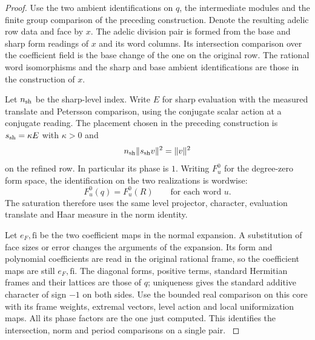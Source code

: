 \begin{proof}
Use the two ambient identifications on \(q\), the intermediate
modules and the finite group comparison of the preceding
construction. Denote the resulting adelic row data and face by
\(x\). The adelic division pair is formed from the base and
sharp form readings of \(x\) and its word columns. Its
intersection comparison over the coefficient field is the
base change of the one on the original row. The rational word
isomorphisms and the sharp and base ambient identifications
are those in the construction of \(x\).

Let \(n_{\rm sh}\) be the sharp-level index. Write \(E\) for
sharp evaluation with the measured translate and Petersson
comparison, using the conjugate scalar action at a conjugate
reading. The placement chosen in the preceding construction
is \(s_{\rm sh}=\kappa E\) with \(\kappa>0\) and
\[
                 n_{\rm sh}\|s_{\rm sh}v\|^2=\|v\|^2
\]
on the refined row. In particular its phase is \(1\). Writing \(F_u^0\) for the degree-zero form space, the identification on the two realizations is wordwise:
\[
 F_u^0(q)=F_u^0(R)\qquad\text{for each word }u .
\]
The saturation therefore uses the same level projector, character,
evaluation translate and Haar measure in the norm identity.

Let \(e_F,\mathrm{fi}\) be the two coefficient maps in the normal
expansion. A substitution of face sizes or error changes the
arguments of the expansion. Its form and polynomial coefficients
are read in the original rational frame, so the coefficient maps
are still \(e_F,\mathrm{fi}\). The diagonal forms, positive
terms, standard Hermitian frames and their lattices are those
of \(q\); uniqueness gives the standard additive character of
sign \(-1\) on both sides. Use the bounded real comparison on
this core with its frame weights, extremal vectors, level action
and local uniformization maps. All its phase factors are the
one just computed. This identifies the intersection, norm and
period comparisons on a single pair. \label{cor:completed-division-1}



\end{proof}
